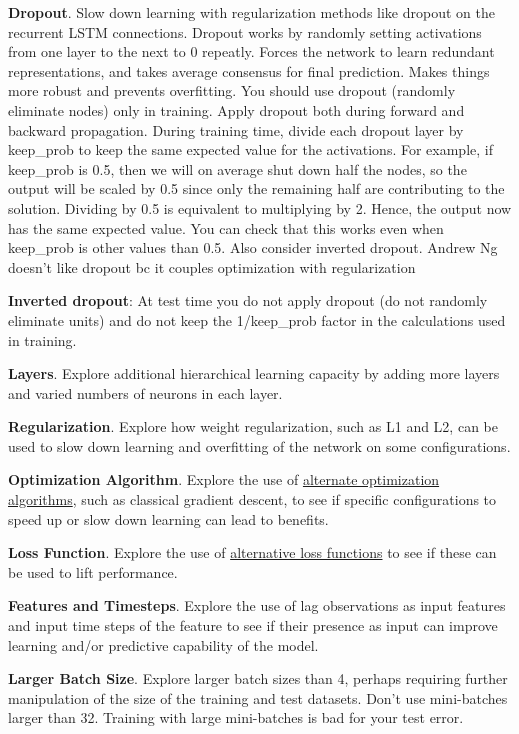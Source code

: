 \documentclass[]{book}
\begin{document}
\textbf{Dropout}. Slow down learning with regularization methods like
dropout on the recurrent LSTM connections. Dropout works by randomly
setting activations from one layer to the next to 0 repeatly. Forces the
network to learn redundant representations, and takes average consensus
for final prediction. Makes things more robust and prevents overfitting.
You should use dropout (randomly eliminate nodes) only in training.
Apply dropout both during forward and backward propagation. During
training time, divide each dropout layer by keep\_prob to keep the same
expected value for the activations. For example, if keep\_prob is 0.5,
then we will on average shut down half the nodes, so the output will be
scaled by 0.5 since only the remaining half are contributing to the
solution. Dividing by 0.5 is equivalent to multiplying by 2. Hence, the
output now has the same expected value. You can check that this works
even when keep\_prob is other values than 0.5. Also consider inverted
dropout. Andrew Ng doesn't like dropout bc it couples optimization with
regularization

\textbf{Inverted dropout}: At test time you do not apply dropout (do not
randomly eliminate units) and do not keep the 1/keep\_prob factor in the
calculations used in training.

\textbf{Layers}. Explore additional hierarchical learning capacity by
adding more layers and varied numbers of neurons in each layer.

\textbf{Regularization}. Explore how weight regularization, such as L1
and L2, can be used to slow down learning and overfitting of the network
on some configurations.

\textbf{Optimization Algorithm}. Explore the use of
\href{https://keras.io/optimizers/}{alternate optimization algorithms},
such as classical gradient descent, to see if specific configurations to
speed up or slow down learning can lead to benefits.

\textbf{Loss Function}. Explore the use of
\href{https://keras.io/objectives/}{alternative loss functions} to see
if these can be used to lift performance.

\textbf{Features and Timesteps}. Explore the use of lag observations as
input features and input time steps of the feature to see if their
presence as input can improve learning and/or predictive capability of
the model.

\textbf{Larger Batch Size}. Explore larger batch sizes than 4, perhaps
requiring further manipulation of the size of the training and test
datasets. Don't use mini-batches larger than 32. Training with large
mini-batches is bad for your test error.
\end{document}
